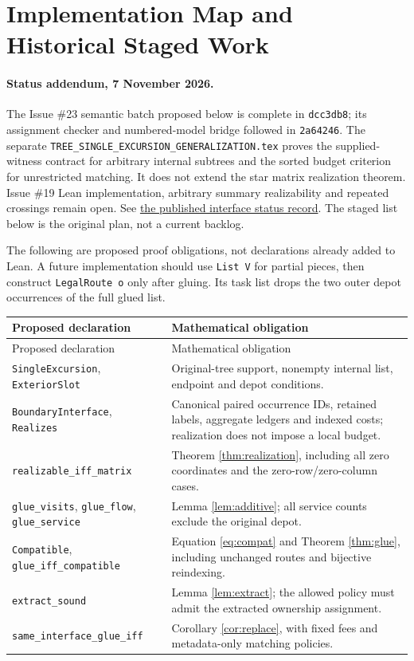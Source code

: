 \documentclass[11pt]{article}
\theoremstyle{remark}
\newcommand{\code}[1]{\nolinkurl{#1}}
\begin{document}
\section{Implementation Map and Historical Staged Work}
\label{sec:plan}

\paragraph{Status addendum, 7 November 2026.}
The Issue \#23 semantic batch proposed below is complete in \code{dcc3db8};
its assignment checker and numbered-model bridge followed in \code{2a64246}.
The separate \code{TREE_SINGLE_EXCURSION_GENERALIZATION.tex} proves the
supplied-witness contract for arbitrary internal subtrees and the sorted
budget criterion for unrestricted matching. It does not extend the star
matrix realization theorem. Issue \#19 Lean implementation, arbitrary
summary realizability and repeated crossings remain open. See
\href{https://github.com/huam54925-cpu/uav-routing-certification/blob/2a64246acd8e5fe323e8d6bbe3fd3399cdedd3df/docs/HUB_INTERFACES_STATUS.md}{the published interface status record}.
The staged list below is the original plan, not a current backlog.

The following are proposed proof obligations, not declarations already added
to Lean. A future implementation should use \code{List V} for partial pieces,
then construct \code{LegalRoute o} only after gluing. Its task list drops the
two outer depot occurrences of the full glued list.

\begin{longtable}{@{}p{}p{}@{}}
\toprule Proposed declaration & Mathematical obligation\\\midrule
\endfirsthead
\toprule Proposed declaration & Mathematical obligation\\\midrule
\endhead
\code{SingleExcursion}, \code{ExteriorSlot} &
Original-tree support, nonempty internal list, endpoint and depot conditions.\\[3pt]
\code{BoundaryInterface}, \code{Realizes} &
Canonical paired occurrence IDs, retained labels, aggregate ledgers and
indexed costs; realization does not impose a local budget.\\[3pt]
\code{realizable_iff_matrix} & Theorem \ref{thm:realization}, including
all zero coordinates and the zero-row/zero-column cases.\\[3pt]
\code{glue_visits}, \code{glue_flow}, \code{glue_service} &
Lemma \ref{lem:additive}; all service counts exclude the original depot.\\[3pt]
\code{Compatible}, \code{glue_iff_compatible} &
Equation \eqref{eq:compat} and Theorem \ref{thm:glue}, including
unchanged routes and bijective reindexing.\\[3pt]
\code{extract_sound} & Lemma \ref{lem:extract}; the allowed policy
must admit the extracted ownership assignment.\\[3pt]
\code{same_interface_glue_iff} & Corollary \ref{cor:replace}, with fixed
fees and metadata-only matching policies.\\
\bottomrule
\end{longtable}
\end{document}
